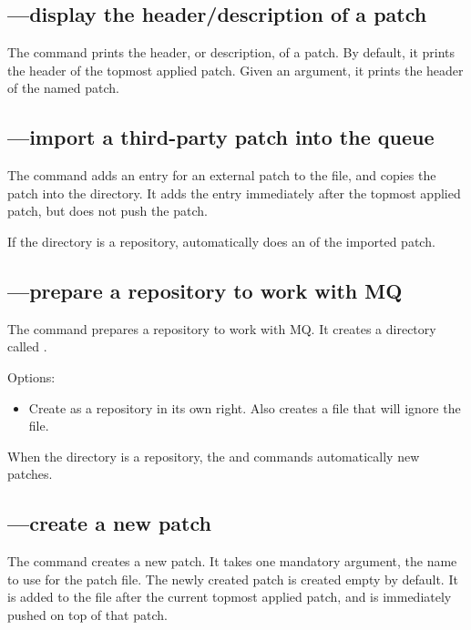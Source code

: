 \subsection{---display the header/description of a patch}

The  command prints the header, or description, of a
patch.  By default, it prints the header of the topmost applied patch.
Given an argument, it prints the header of the named patch.

\subsection{---import a third-party patch into the queue}

The  command adds an entry for an external patch to the
 file, and copies the patch into the
 directory.  It adds the entry immediately after
the topmost applied patch, but does not push the patch.

If the  directory is a repository,
 automatically does an  of the imported
patch.

\subsection{---prepare a repository to work with MQ}

The  command prepares a repository to work with MQ.  It
creates a directory called .

Options:
\begin{itemize}
\item[\hgopt{qinit}{-c}] Create  as a repository
  in its own right.  Also creates a  file that
  will ignore the  file.
\end{itemize}

When the  directory is a repository, the
 and  commands automatically 
new patches.

\subsection{---create a new patch}

The  command creates a new patch.  It takes one mandatory
argument, the name to use for the patch file.  The newly created patch
is created empty by default.  It is added to the 
file after the current topmost applied patch, and is immediately
pushed on top of that patch.

